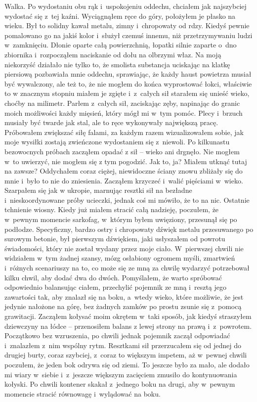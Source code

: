 Walka. Po wydostaniu obu rąk i~uspokojeniu oddechu, chciałem jak najszybciej wydostać się z~tej kaźni. Wyciągnąłem ręce do góry, położyłem je płasko na wieku. Był to solidny kawał metalu, zimny i~chropowaty od rdzy. Kiedyś pewnie pomalowano go na jakiś kolor i~służył czemuś innemu, niż przetrzymywaniu ludzi w~zamknięciu. Dłonie oparte całą powierzchnią, łopatki silnie zaparte o~dno zbiornika i~rozpocząłem naciskanie od dołu na olbrzymi właz. Na moją niekorzyść działało nie tylko to, że smolista substancja uciskając na klatkę piersiową pozbawiała mnie oddechu, sprawiając, że każdy haust powietrza musiał być wywalczony, ale też to, że nie mogłem do końca wyprostować łokci, właściwie to w znacznym stopniu miałem je zgięte i~z~całych sił starałem się unieść wieko, choćby na milimetr. Parłem z~całych sił, zaciskając zęby, napinając do granic moich możliwości każdy mięsień, który mógł mi w~tym pomóc. Plecy i~brzuch musiały być twarde jak stal, ale to ręce wykonywały największą pracę. Próbowałem zwiększać siłę falami, za każdym razem wizualizowałem sobie, jak moje wysiłki zostają zwieńczone wydostaniem się z~niewoli. Po kilkunastu bezowocnych próbach zacząłem opadać z sił -- wieko ani drgnęło. Nie mogłem w~to uwierzyć, nie mogłem się z tym pogodzić. Jak to, ja? Miałem utknąć tutaj na zawsze? Oddychałem coraz ciężej, niewidoczne ściany znowu zbliżały się do mnie i~było to nie do zniesienia. Zacząłem krzyczeć i~walić pięściami w~wieko. Szarpałem się jak w ukropie, marnując resztki sił na bezładne i~nieskoordynowane próby ucieczki, jednak coś mi mówiło, że to na nic. Ostatnie tchnienie wiosny. Kiedy już miałem stracić całą nadzieję, poczułem, że w~pewnym momencie sarkofag, w~którym byłem uwięziony, przesunął się po podłodze. Specyficzny, bardzo ostry i chropowaty dźwięk metalu przesuwanego po surowym betonie, był pierwszym dźwiękiem, jaki usłyszałem od powrotu świadomości, który nie został wydany przez moje ciało. W~pierwszej chwili nie widziałem w~tym żadnej szansy, mózg osłabiony ogromem myśli, zmartwień i~różnych scenariuszy na to, co może się ze mną za chwilę wydarzyć potrzebował kilku chwil, aby dodać dwa do dwóch. Pomyślałem, że warto spróbować odpowiednio balansując ciałem, przechylić pojemnik ze mną i~resztą jego zawartości tak, aby znalazł się na boku, a~wtedy wieko, które możliwie, że jest jedynie nałożone na górę, bez żadnych zamków po prostu zsunie się z~pomocą grawitacji. Zacząłem kołysać moim okrętem w~taki sposób, jak kiedyś straszyłem dziewczyny na łódce -- przenosiłem balans z lewej strony na prawą i~z~powrotem. Początkowo bez wzruszenia, po chwili jednak pojemnik zaczął odpowiadać i~znalazłem z~nim wspólny rytm. Resztkami sił przerzucałem się od jednej do drugiej burty, coraz szybciej, z~coraz to większym impetem, aż w~pewnej chwili poczułem, że jeden bok odrywa się od ziemi. To jeszcze było za mało, ale dodało mi wiary w~siebie i~z~jeszcze większym zacięciem zmusiło do kontynuowania kołyski. Po chwili kontener skakał z~jednego boku na drugi, aby w~pewnym momencie stracić równowagę i~wylądować na boku. 

